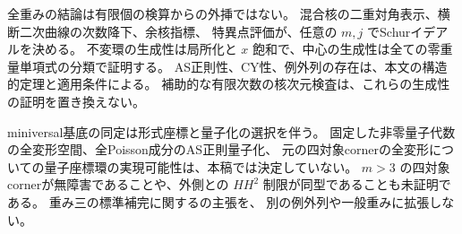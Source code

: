 全重みの結論は有限個の検算からの外挿ではない。
混合核の二重対角表示、横断二次曲線の次数降下、余核指標、
特異点評価が、任意の $m,j$ でSchurイデアルを決める。
不変環の生成性は局所化と $x$ 飽和で、中心の生成性は全ての零重量単項式の分類で証明する。
AS正則性、CY性、例外列の存在は、本文の構造的定理と適用条件による。
補助的な有限次数の核次元検査は、これらの生成性の証明を置き換えない。

miniversal基底の同定は形式座標と量子化の選択を伴う。
固定した非零量子代数の全変形空間、全Poisson成分のAS正則量子化、
元の四対象cornerの全変形についての量子座標環の実現可能性は、本稿では決定していない。
$m>3$ の四対象cornerが無障害であることや、外側との $HH^2$ 制限が同型であることも未証明である。
重み三の標準補完に関する\cite{VKAmbient32}の主張を、
別の例外列や一般重みに拡張しない。
